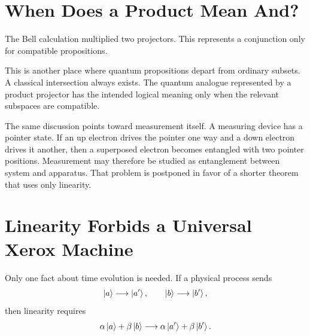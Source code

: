 \section{When Does a Product Mean And?}

The Bell calculation multiplied two projectors. This represents a conjunction only for compatible propositions.

\begin{classroomqa}
\end{classroomqa}

This is another place where quantum propositions depart from ordinary subsets. A classical intersection always exists. The quantum analogue represented by a product projector has the intended logical meaning only when the relevant subspaces are compatible.

The same discussion points toward measurement itself. A measuring device has a pointer state. If an up electron drives the pointer one way and a down electron drives it another, then a superposed electron becomes entangled with two pointer positions. Measurement may therefore be studied as entanglement between system and apparatus. That problem is postponed in favor of a shorter theorem that uses only linearity.

\begin{classroomqa}
\end{classroomqa}

\section{Linearity Forbids a Universal Xerox Machine}

Only one fact about time evolution is needed. If a physical process sends
\begin{equation}
  \left\lvert a\right\rangle\longrightarrow\left\lvert a'\right\rangle,
  \qquad
  \left\lvert b\right\rangle\longrightarrow\left\lvert b'\right\rangle,
\end{equation}
then linearity requires
\begin{equation}
  \alpha\left\lvert a\right\rangle+\beta\left\lvert b\right\rangle
  \longrightarrow
  \alpha\left\lvert a'\right\rangle+\beta\left\lvert b'\right\rangle.
  \label{eq:l05-linearity}
\end{equation}

